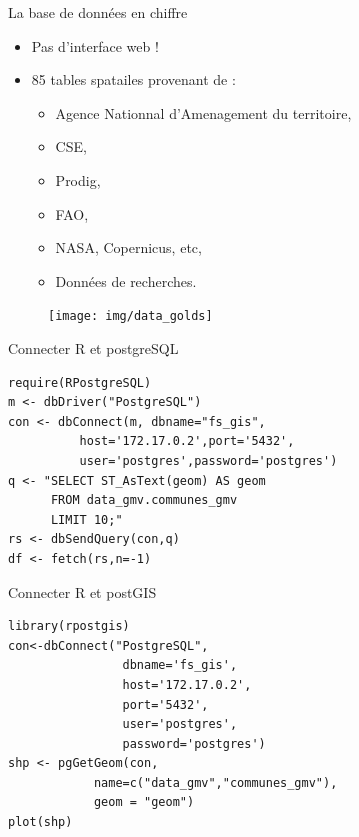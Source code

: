 \documentclass[newPxFont]{beamer}
\begin{document}
\begin{frame}[fragile]{La base de données en chiffre}
\vspace{-2em}
\begin{itemize}
  \item Pas d'interface web !
  \item 85 tables spatailes provenant de :
    \begin{itemize}
      \item Agence Nationnal d'Amenagement du territoire,
      \item CSE,
      \item Prodig,
      \item FAO,
      \item NASA, Copernicus, etc,
      \item Données de recherches.
    \end{itemize}
\end{itemize}
\begin{figure}
	\centering
	\texttt{[image: img/data\_golds]}
\end{figure}
\end{frame}

\begin{frame}[fragile]{Connecter R et postgreSQL}
\vspace{-2em}
\begin{verbatim}
require(RPostgreSQL)
m <- dbDriver("PostgreSQL")
con <- dbConnect(m, dbname="fs_gis",
          host='172.17.0.2',port='5432',
          user='postgres',password='postgres')
q <- "SELECT ST_AsText(geom) AS geom
      FROM data_gmv.communes_gmv
      LIMIT 10;"
rs <- dbSendQuery(con,q)
df <- fetch(rs,n=-1)
\end{verbatim}
\end{frame}

\begin{frame}[fragile]{Connecter R et postGIS}
\vspace{-2em}
\begin{verbatim}
library(rpostgis)
con<-dbConnect("PostgreSQL",
                dbname='fs_gis',
                host='172.17.0.2',
                port='5432',
                user='postgres',
                password='postgres')
shp <- pgGetGeom(con,
            name=c("data_gmv","communes_gmv"),
            geom = "geom")
plot(shp)
\end{verbatim}
\end{frame}
\end{document}
